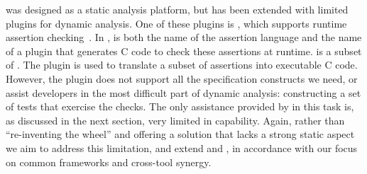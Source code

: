 \framac was designed as a static analysis platform, but has been extended with limited plugins for dynamic analysis.
One of these plugins is \eacsl, which supports runtime assertion checking~\cite{CR2006:SEN}.
In \framac, \eacsl is both the name of the assertion language and the name of a plugin that generates C code to check these assertions at runtime.
\eacsl is a subset of \acsl.  The plugin \eacsl is used to translate a subset of \framac assertions into executable C code.
However, the \eacsl plugin does not support all the specification constructs we need, or assist developers in the most difficult part of dynamic analysis:  constructing a set of tests that exercise the checks.  The only assistance provided by \framac in this task is, as discussed in the next section, very limited in capability.  Again, rather than ``re-inventing the wheel'' and offering a solution that lacks a strong static aspect we aim to address this limitation, and extend \acsl and \eacsl, in accordance with our focus on common frameworks and cross-tool synergy. 